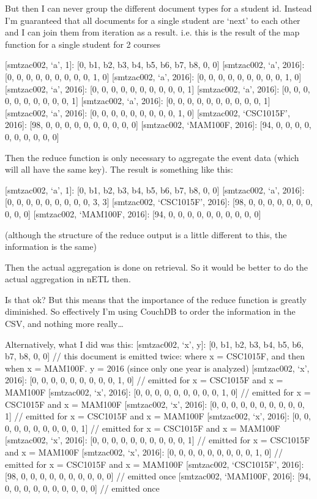 But then I can never group the different document types for a student id. Instead I’m guaranteed that all documents for a single student are ‘next’ to each other and I can join them from iteration as a result. i.e. this is the result of the map function for a single student for 2 courses

    [smtzac002, ‘a’, 1]: [0, b1, b2, b3, b4, b5, b6, b7, b8, 0, 0]
[smtzac002, ‘a’, 2016]: [0, 0, 0, 0, 0, 0, 0, 0, 0, 1, 0]
[smtzac002, ‘a’, 2016]: [0, 0, 0, 0, 0, 0, 0, 0, 0, 1, 0]
[smtzac002, ‘a’, 2016]: [0, 0, 0, 0, 0, 0, 0, 0, 0, 0, 1]
[smtzac002, ‘a’, 2016]: [0, 0, 0, 0, 0, 0, 0, 0, 0, 0, 1]
[smtzac002, ‘a’, 2016]: [0, 0, 0, 0, 0, 0, 0, 0, 0, 0, 1]
[smtzac002, ‘a’, 2016]: [0, 0, 0, 0, 0, 0, 0, 0, 0, 1, 0]
[smtzac002, ‘CSC1015F’, 2016]: [98, 0, 0, 0, 0, 0, 0, 0, 0, 0, 0]
[smtzac002, ‘MAM100F, 2016]: [94, 0, 0, 0, 0, 0, 0, 0, 0, 0, 0]

Then the reduce function is only necessary to aggregate the event data (which will all have the same key). The result is something like this:

[smtzac002, ‘a’, 1]: [0, b1, b2, b3, b4, b5, b6, b7, b8, 0, 0]
[smtzac002, ‘a’, 2016]: [0, 0, 0, 0, 0, 0, 0, 0, 0, 3, 3]
[smtzac002, ‘CSC1015F’, 2016]: [98, 0, 0, 0, 0, 0, 0, 0, 0, 0, 0]
[smtzac002, ‘MAM100F, 2016]: [94, 0, 0, 0, 0, 0, 0, 0, 0, 0, 0]

(although the structure of the reduce output is a little different to this, the information is the same)

Then the actual aggregation is done on retrieval. So it would be better to do the actual aggregation in nETL then.

Is that ok? But this means that the importance of the reduce function is greatly diminished. So effectively I’m using CouchDB to order the information in the CSV, and nothing more really…

Alternatively, what I did was this:
[smtzac002, ‘x’, y]: [0, b1, b2, b3, b4, b5, b6, b7, b8, 0, 0] // this document is emitted twice: where x = CSC1015F, and then when x = MAM100F. y = 2016 (since only one year is analyzed)
[smtzac002, ‘x’, 2016]: [0, 0, 0, 0, 0, 0, 0, 0, 0, 1, 0] // emitted for x = CSC1015F and x = MAM100F
    [smtzac002, ‘x’, 2016]: [0, 0, 0, 0, 0, 0, 0, 0, 0, 1, 0] // emitted for x = CSC1015F and x = MAM100F
    [smtzac002, ‘x’, 2016]: [0, 0, 0, 0, 0, 0, 0, 0, 0, 0, 1] // emitted for x = CSC1015F and x = MAM100F
    [smtzac002, ‘x’, 2016]: [0, 0, 0, 0, 0, 0, 0, 0, 0, 0, 1] // emitted for x = CSC1015F and x = MAM100F
    [smtzac002, ‘x’, 2016]: [0, 0, 0, 0, 0, 0, 0, 0, 0, 0, 1] // emitted for x = CSC1015F and x = MAM100F
    [smtzac002, ‘x’, 2016]: [0, 0, 0, 0, 0, 0, 0, 0, 0, 1, 0] // emitted for x = CSC1015F and x = MAM100F
    [smtzac002, ‘CSC1015F’, 2016]: [98, 0, 0, 0, 0, 0, 0, 0, 0, 0, 0] // emitted once
    [smtzac002, ‘MAM100F, 2016]: [94, 0, 0, 0, 0, 0, 0, 0, 0, 0, 0] // emitted once


